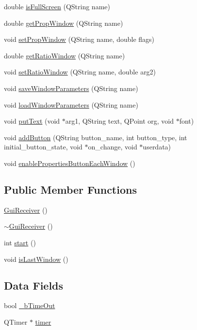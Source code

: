 \begin{DoxyCompactItemize}
\item 
double \hyperlink{classGuiReceiver_a6dd924ef78d8e7ec9e008f9007dbd032}{isFullScreen} (QString name)
\item 
double \hyperlink{classGuiReceiver_aff1aa23d540c06006c295ce69c8bb771}{getPropWindow} (QString name)
\item 
void \hyperlink{classGuiReceiver_a2f7df93bb22ec310b8f9b44844662b85}{setPropWindow} (QString name, double flags)
\item 
double \hyperlink{classGuiReceiver_aaf16c278a39a4ee6a02de8de5e348c5c}{getRatioWindow} (QString name)
\item 
void \hyperlink{classGuiReceiver_a42057f63804bb4f378c9ecb9a77f140c}{setRatioWindow} (QString name, double arg2)
\item 
void \hyperlink{classGuiReceiver_a0b4cb6c25ca109fdbcdc0538caf91da5}{saveWindowParameters} (QString name)
\item 
void \hyperlink{classGuiReceiver_afc852e63d8d8e4158984d37a444927ee}{loadWindowParameters} (QString name)
\item 
void \hyperlink{classGuiReceiver_a9d6fca288ed9086e22ad5d85ef0a3ae3}{putText} (void $\ast$arg1, QString text, QPoint org, void $\ast$font)
\item 
void \hyperlink{classGuiReceiver_aa1507b4023e4881e37c4b2a2ba0c2353}{addButton} (QString button\_\-name, int button\_\-type, int initial\_\-button\_\-state, void $\ast$on\_\-change, void $\ast$userdata)
\item 
void \hyperlink{classGuiReceiver_ad4c4385d49e830263e996416e16d137a}{enablePropertiesButtonEachWindow} ()
\end{DoxyCompactItemize}
\subsection*{Public Member Functions}
\begin{DoxyCompactItemize}
\item 
\hyperlink{classGuiReceiver_a0f840f04f1834a394fceeeca7dd88827}{GuiReceiver} ()
\item 
\hyperlink{classGuiReceiver_a7655140d1defb2adb481eab40193fd97}{$\sim$GuiReceiver} ()
\item 
int \hyperlink{classGuiReceiver_a4f0ca1781d324a9b658b01034895e1ee}{start} ()
\item 
void \hyperlink{classGuiReceiver_a9f788023836b17e8aed97b3770386ea9}{isLastWindow} ()
\end{DoxyCompactItemize}
\subsection*{Data Fields}
\begin{DoxyCompactItemize}
\item 
bool \hyperlink{classGuiReceiver_ad2d629b90a37e814db074e7ba1fc1aa9}{\_\-bTimeOut}
\item 
QTimer $\ast$ \hyperlink{classGuiReceiver_aeb64966586c4a35cfc02db46491afdf6}{timer}
\end{DoxyCompactItemize}



